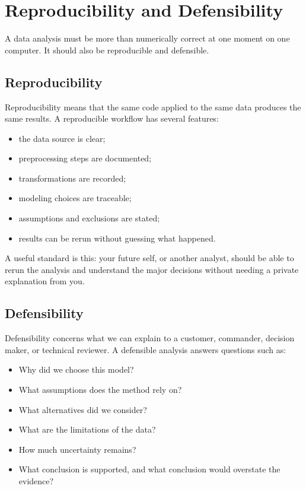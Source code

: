 \section{Reproducibility and Defensibility}

A data analysis must be more than numerically correct at one moment on one computer.  It should also be reproducible and defensible.

\subsection{Reproducibility}

Reproducibility means that the same code applied to the same data produces the same results.  A reproducible workflow has several features:
\begin{itemize}
  \item the data source is clear;
  \item preprocessing steps are documented;
  \item transformations are recorded;
  \item modeling choices are traceable;
  \item assumptions and exclusions are stated;
  \item results can be rerun without guessing what happened.
\end{itemize}

A useful standard is this: your future self, or another analyst, should be able to rerun the analysis and understand the major decisions without needing a private explanation from you.

\subsection{Defensibility}

Defensibility concerns what we can explain to a customer, commander, decision maker, or technical reviewer.  A defensible analysis answers questions such as:
\begin{itemize}
  \item Why did we choose this model?
  \item What assumptions does the method rely on?
  \item What alternatives did we consider?
  \item What are the limitations of the data?
  \item How much uncertainty remains?
  \item What conclusion is supported, and what conclusion would overstate the evidence?
\end{itemize}

